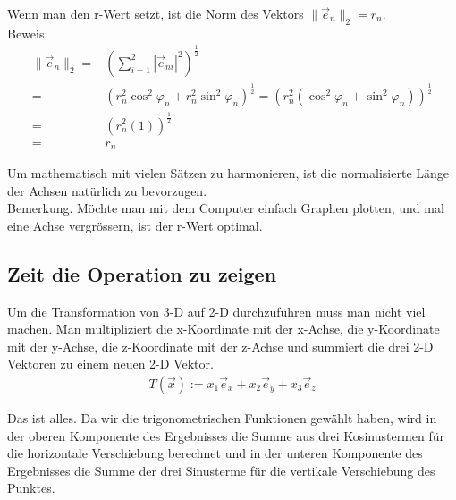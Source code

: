 \documentclass[a4paper]{article}
\begin{document}
Wenn man den r-Wert setzt, ist die Norm des Vektors $\|\vec{e}_n\|_2 = r_n$.\\

Beweis:\\
\begin{displaymath}
\begin{align}
    \|\vec{e}_n\|_2 =& (\sum_{i=1}^{2}|\vec{e}_{ni}|^2)^{\frac12} \\
    =& (r_{n}^{2}\cos^{2}\varphi_n + r_{n}^{2}\sin^{2}\varphi_n)^{\frac12} = (r_{n}^2(\cos^{2}\varphi_n + \sin^{2}\varphi_n))^{\frac12}\\
    =& (r_{n}^2(1))^{\frac12} \\
    =& r_n
\end{align}
\end{displaymath}

Um mathematisch mit vielen S\"atzen zu harmonieren, ist die normalisierte L\"ange der Achsen nat\"urlich zu bevorzugen.\\

Bemerkung. M\"ochte man mit dem Computer einfach Graphen plotten, und mal eine Achse vergr\"ossern, ist der r-Wert optimal.\\


\subsection{Zeit die Operation zu zeigen}


Um die Transformation von 3-D auf 2-D durchzuf\"uhren muss man nicht viel machen. Man multipliziert die x-Koordinate mit der x-Achse,
die y-Koordinate mit der y-Achse, die z-Koordinate mit der z-Achse und summiert die drei 2-D Vektoren zu einem neuen 2-D Vektor.\\

\begin{displaymath}
\begin{align}
    T(\vec{x}) := x_1 \vec{e}_x + x_2 \vec{e}_y + x_3 \vec{e}_z
\end{align}
\end{displaymath}

Das ist alles. Da wir die trigonometrischen Funktionen gew\"ahlt haben, wird in der oberen Komponente des Ergebnisses die Summe aus drei Kosinustermen f\"ur die horizontale Verschiebung berechnet und in der unteren Komponente des Ergebnisses die Summe der drei Sinusterme f\"ur die vertikale Verschiebung des Punktes. 
\end{document}

